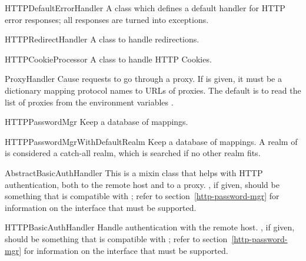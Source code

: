 \begin{classdesc}{HTTPDefaultErrorHandler}{}
A class which defines a default handler for HTTP error responses; all
responses are turned into  exceptions.
\end{classdesc}

\begin{classdesc}{HTTPRedirectHandler}{}
A class to handle redirections.
\end{classdesc}

\begin{classdesc}{HTTPCookieProcessor}{}
A class to handle HTTP Cookies.
\end{classdesc}

\begin{classdesc}{ProxyHandler}{}
Cause requests to go through a proxy.
If  is given, it must be a dictionary mapping
protocol names to URLs of proxies.
The default is to read the list of proxies from the environment
variables .
\end{classdesc}

\begin{classdesc}{HTTPPasswordMgr}{}
Keep a database of 
mappings.
\end{classdesc}

\begin{classdesc}{HTTPPasswordMgrWithDefaultRealm}{}
Keep a database of 
 mappings.
A realm of  is considered a catch-all realm, which is searched
if no other realm fits.
\end{classdesc}

\begin{classdesc}{AbstractBasicAuthHandler}{}
This is a mixin class that helps with HTTP authentication, both
to the remote host and to a proxy.
, if given, should be something that is compatible
with ; refer to section~\ref{http-password-mgr}
for information on the interface that must be supported.
\end{classdesc}

\begin{classdesc}{HTTPBasicAuthHandler}{}
Handle authentication with the remote host.
, if given, should be something that is compatible
with ; refer to section~\ref{http-password-mgr}
for information on the interface that must be supported.
\end{classdesc}

